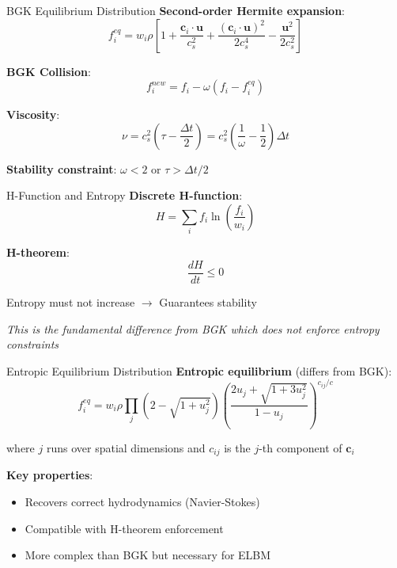 \documentclass[aspectratio=169]{beamer}
\begin{document}
\begin{frame}{BGK Equilibrium Distribution}
\textbf{Second-order Hermite expansion}:
$$f_i^{eq} = w_i \rho \left[1 + \frac{\mathbf{c}_i \cdot \mathbf{u}}{c_s^2} + \frac{(\mathbf{c}_i \cdot \mathbf{u})^2}{2c_s^4} - \frac{\mathbf{u}^2}{2c_s^2}\right]$$

\vspace{0.3cm}
\textbf{BGK Collision}:
$$f_i^{new} = f_i - \omega(f_i - f_i^{eq})$$

\vspace{0.3cm}
\textbf{Viscosity}:
$$\nu = c_s^2\left(\tau - \frac{\Delta t}{2}\right) = c_s^2\left(\frac{1}{\omega} - \frac{1}{2}\right)\Delta t$$

\vspace{0.3cm}
\textbf{Stability constraint}: $\omega < 2$ or $\tau > \Delta t/2$
\end{frame}

\begin{frame}{H-Function and Entropy}
\textbf{Discrete H-function}:
$$H = \sum_{i} f_i \ln\left(\frac{f_i}{w_i}\right)$$

\textbf{H-theorem}:
$$\frac{dH}{dt} \leq 0$$

\vspace{0.3cm}
Entropy must not increase $\rightarrow$ Guarantees stability

\vspace{0.3cm}
\textit{This is the fundamental difference from BGK which does not enforce entropy constraints}
\end{frame}

\begin{frame}{Entropic Equilibrium Distribution}
\textbf{Entropic equilibrium} (differs from BGK):
$$f_i^{eq} = w_i \rho \prod_j \left(2-\sqrt{1+u_j^2}\right) \left(\frac{2u_j+\sqrt{1+3u_j^2}}{1-u_j}\right)^{c_{ij}/c}$$

\vspace{0.3cm}
where $j$ runs over spatial dimensions and $c_{ij}$ is the $j$-th component of $\mathbf{c}_i$

\vspace{0.5cm}
\textbf{Key properties}:
\begin{itemize}
    \item Recovers correct hydrodynamics (Navier-Stokes)
    \item Compatible with H-theorem enforcement
    \item More complex than BGK but necessary for ELBM
\end{itemize}
\end{frame}
\end{document}
